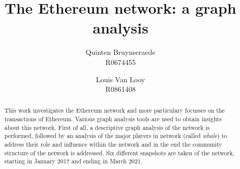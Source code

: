 \documentclass[10pt,a4paper]{article}
\author{Quinten Bruynseraede  \\ R0674455 \and Louis Van Looy \\ R0861408}
\title{The Ethereum network: a graph analysis}
\begin{document}
\maketitle

\begin{abstract}
	
This work investigates the Ethereum network and more particulary focusses on the transactions of Ethereum. Various graph analysis tools are used to obtain insights about this network. First of all, a descriptive graph analysis of the network is performed, followed by an analysis of the major players in network (called \textit {whale}) to address their role and influence within the network and in the end the community structure of the network is addressed. Six different snapshots are taken of the network, starting in January 2017 and ending in March 2021. 

\end{abstract}
\end{document}
